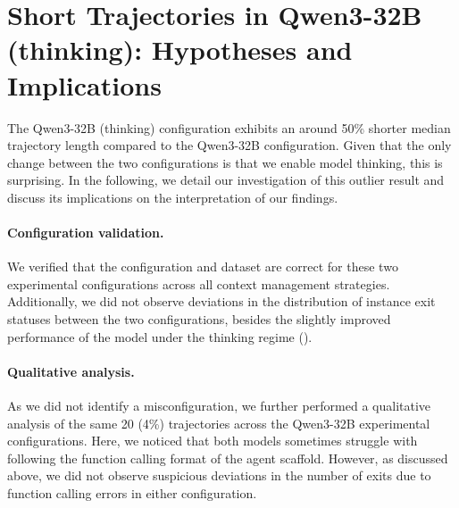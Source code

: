 \documentclass{article}
\begin{document}

\section{Short Trajectories in Qwen3-32B (thinking): Hypotheses and Implications}
\label{sec:short-traj-qwen32-thinking}
The Qwen3-32B (thinking) configuration exhibits an around 50\% shorter median trajectory length compared to the Qwen3-32B configuration. Given that the only change between the two configurations is that we enable model thinking, this is surprising. In the following, we detail our investigation of this outlier result and discuss its implications on the interpretation of our findings.

\paragraph{Configuration validation.} We verified that the configuration and dataset are correct for these two experimental configurations across all context management strategies. Additionally, we did not observe deviations in the distribution of instance exit statuses between the two configurations, besides the slightly improved performance of the model under the thinking regime (). 

\paragraph{Qualitative analysis.} As we did not identify a misconfiguration, we further performed a qualitative analysis of the same 20 (4\%) trajectories across the Qwen3-32B experimental configurations. Here, we noticed that both models sometimes struggle with following the function calling format of the agent scaffold. However, as discussed above, we did not observe suspicious deviations in the number of exits due to function calling errors in either configuration.
\end{document}
